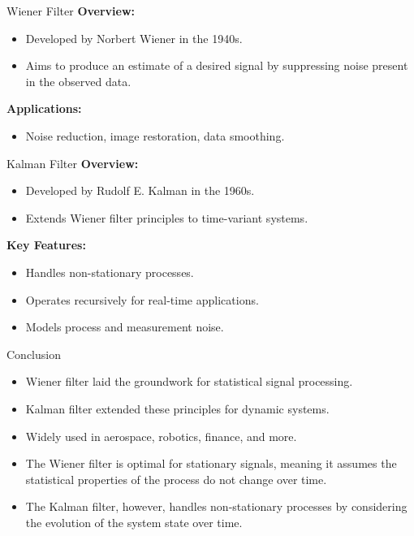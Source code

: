 \begin{frame}{Wiener Filter}
    \textbf{Overview:}
    \begin{itemize}
        \item Developed by Norbert Wiener in the 1940s.
        \item Aims to produce an estimate of a desired signal by suppressing noise present in the observed data.
    \end{itemize}
    \vspace{0.5cm}
    \textbf{Applications:}
    \begin{itemize}
        \item Noise reduction, image restoration, data smoothing.
    \end{itemize}
\end{frame}

\begin{frame}{Kalman Filter}
    \textbf{Overview:}
    \begin{itemize}
        \item Developed by Rudolf E. Kalman in the 1960s.
        \item Extends Wiener filter principles to time-variant systems.
    \end{itemize}
    \vspace{0.5cm}
    \textbf{Key Features:}
    \begin{itemize}
        \item Handles non-stationary processes.
        \item Operates recursively for real-time applications.
        \item Models process and measurement noise.
    \end{itemize}
\end{frame}


\begin{frame}{Conclusion}
    \begin{itemize}
        \item Wiener filter laid the groundwork for statistical signal processing.
        \item Kalman filter extended these principles for dynamic systems.
        \item Widely used in aerospace, robotics, finance, and more.
    \end{itemize}
    \vspace{0.5cm}
    \begin{itemize}
        \item The Wiener filter is optimal for stationary signals, meaning it assumes the statistical properties of the process do not change over time.
        \item The Kalman filter, however, handles non-stationary processes by considering the evolution of the system state over time.
    \end{itemize}
\end{frame}
